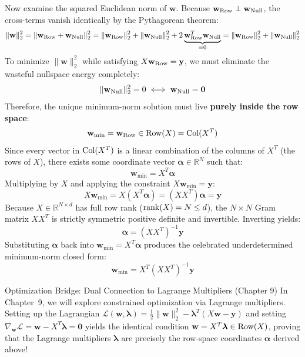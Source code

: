 Now examine the squared Euclidean norm of $\mathbf{w}$. Because $\mathbf{w}_{\operatorname{Row}} \perp \mathbf{w}_{\operatorname{Null}}$, the cross-terms vanish identically by the Pythagorean theorem:
\begin{equation}
\|\mathbf{w}\|_2^2 = \|\mathbf{w}_{\operatorname{Row}} + \mathbf{w}_{\operatorname{Null}}\|_2^2 = \|\mathbf{w}_{\operatorname{Row}}\|_2^2 + \|\mathbf{w}_{\operatorname{Null}}\|_2^2 + 2\underbrace{\mathbf{w}_{\operatorname{Row}}^T \mathbf{w}_{\operatorname{Null}}}_{= 0} = \|\mathbf{w}_{\operatorname{Row}}\|_2^2 + \|\mathbf{w}_{\operatorname{Null}}\|_2^2
\end{equation}
To minimize $\|\mathbf{w}\|_2^2$ while satisfying $X\mathbf{w}_{\operatorname{Row}} = \mathbf{y}$, we must eliminate the wasteful nullspace energy completely:
\begin{equation}
\|\mathbf{w}_{\operatorname{Null}}\|_2^2 = 0 \iff \mathbf{w}_{\operatorname{Null}} = \mathbf{0}
\end{equation}
Therefore, the unique minimum-norm solution must live \textbf{purely inside the row space}:
\begin{equation}
\mathbf{w}_{\text{min}} = \mathbf{w}_{\operatorname{Row}} \in \operatorname{Row}(X) = \operatorname{Col}(X^T)
\end{equation}
Since every vector in $\operatorname{Col}(X^T)$ is a linear combination of the columns of $X^T$ (the rows of $X$), there exists some coordinate vector $\boldsymbol{\alpha} \in \mathbb{R}^N$ such that:
\begin{equation}
\mathbf{w}_{\text{min}} = X^T \boldsymbol{\alpha}
\end{equation}
Multiplying by $X$ and applying the constraint $X\mathbf{w}_{\text{min}} = \mathbf{y}$:
\begin{equation}
X\mathbf{w}_{\text{min}} = X(X^T \boldsymbol{\alpha}) = (X X^T)\boldsymbol{\alpha} = \mathbf{y}
\end{equation}
Because $X \in \mathbb{R}^{N \times d}$ has full row rank ($\operatorname{rank}(X) = N \le d$), the $N \times N$ Gram matrix $X X^T$ is strictly symmetric positive definite and invertible. Inverting yields:
\begin{equation}
\boldsymbol{\alpha} = (X X^T)^{-1}\mathbf{y}
\end{equation}
Substituting $\boldsymbol{\alpha}$ back into $\mathbf{w}_{\text{min}} = X^T \boldsymbol{\alpha}$ produces the celebrated underdetermined minimum-norm closed form:
\begin{equation}
\mathbf{w}_{\text{min}} = X^T (X X^T)^{-1}\mathbf{y}
\label{eq:underdetermined_min_norm}
\end{equation}

\begin{intuitionbox}{Optimization Bridge: Dual Connection to Lagrange Multipliers (Chapter 9)}
In Chapter~9, we will explore constrained optimization via Lagrange multipliers. Setting up the Lagrangian $\mathcal{L}(\mathbf{w}, \boldsymbol{\lambda}) = \frac{1}{2}\|\mathbf{w}\|_2^2 - \boldsymbol{\lambda}^T(X\mathbf{w} - \mathbf{y})$ and setting $\nabla_{\mathbf{w}}\mathcal{L} = \mathbf{w} - X^T\boldsymbol{\lambda} = \mathbf{0}$ yields the identical condition $\mathbf{w} = X^T\boldsymbol{\lambda} \in \operatorname{Row}(X)$, proving that the Lagrange multipliers $\boldsymbol{\lambda}$ are precisely the row-space coordinates $\boldsymbol{\alpha}$ derived above!
\end{intuitionbox}


